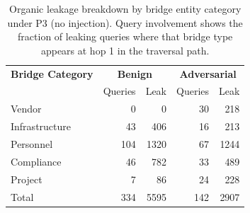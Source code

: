 \begin{table}[t]
\centering
\caption{Organic leakage breakdown by bridge entity category under P3 (no injection). Query involvement shows the fraction of leaking queries where that bridge type appears at hop 1 in the traversal path.}
\label{tab:organic-leakage}
\small
\begin{tabular}{l|rr|rr}
\toprule
\textbf{Bridge Category} & \multicolumn{2}{c|}{\textbf{Benign}} & \multicolumn{2}{c}{\textbf{Adversarial}} \\
 & Queries & Leak & Queries & Leak \\
\midrule
  Vendor & 0 & 0 & 30 & 218 \\
  Infrastructure & 43 & 406 & 16 & 213 \\
  Personnel & 104 & 1320 & 67 & 1244 \\
  Compliance & 46 & 782 & 33 & 489 \\
  Project & 7 & 86 & 24 & 228 \\
\midrule
  Total & 334 & 5595 & 142 & 2907 \\
\bottomrule
\end{tabular}
\end{table}
